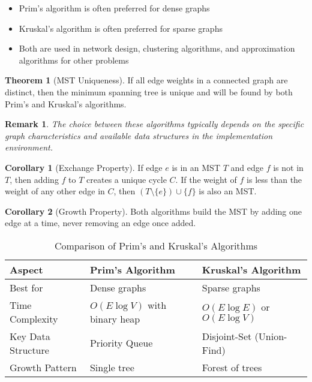 \documentclass{article}
\newtheorem{remark}{Remark}
\theoremstyle{definition}
\newtheorem{theorem}{Theorem}
\newtheorem{corollary}{Corollary}
\begin{document}
\begin{itemize}
\item Prim's algorithm is often preferred for dense graphs
\item Kruskal's algorithm is often preferred for sparse graphs
\item Both are used in network design, clustering algorithms, and approximation algorithms for other problems
\end{itemize}

\begin{theorem}[MST Uniqueness]
If all edge weights in a connected graph are distinct, then the minimum spanning tree is unique and will be found by both Prim's and Kruskal's algorithms.
\end{theorem}

\begin{remark}
The choice between these algorithms typically depends on the specific graph characteristics and available data structures in the implementation environment.
\end{remark}

\begin{corollary}[Exchange Property]
If edge $e$ is in an MST $T$ and edge $f$ is not in $T$, then adding $f$ to $T$ creates a unique cycle $C$. If the weight of $f$ is less than the weight of any other edge in $C$, then $(T \setminus \{e\}) \cup \{f\}$ is also an MST.
\end{corollary}

\begin{corollary}[Growth Property]
Both algorithms build the MST by adding one edge at a time, never removing an edge once added.
\end{corollary}

\begin{table}[h]
\centering
\begin{tabular}{|l|l|l|}
\hline
\textbf{Aspect} & \textbf{Prim's Algorithm} & \textbf{Kruskal's Algorithm} \\
\hline
Best for & Dense graphs & Sparse graphs \\
\hline
Time Complexity & $O(E \log V)$ with binary heap & $O(E \log E)$ or $O(E \log V)$ \\
\hline
Key Data Structure & Priority Queue & Disjoint-Set (Union-Find) \\
\hline
Growth Pattern & Single tree & Forest of trees \\
\hline
\end{tabular}
\caption{Comparison of Prim's and Kruskal's Algorithms}
\end{table}
\end{document}
